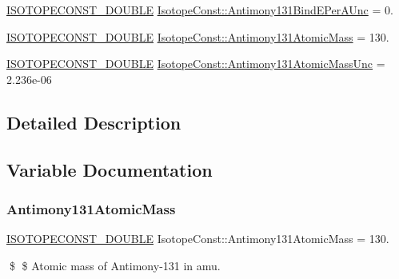 \begin{DoxyCompactItemize}
\mbox{\hyperlink{group___isotope_const-_macros_ga8f45a7272ce02c0b4c65c44636ed719a}{I\+S\+O\+T\+O\+P\+E\+C\+O\+N\+S\+T\+\_\+\+D\+O\+U\+B\+LE}} \mbox{\hyperlink{group___isotope_const-_antimony-_sb131_ga25c8487bedc66d9fea1106de04e292b6}{Isotope\+Const\+::\+Antimony131\+Bind\+E\+Per\+A\+Unc}} = 0.
\item 
\mbox{\hyperlink{group___isotope_const-_macros_ga8f45a7272ce02c0b4c65c44636ed719a}{I\+S\+O\+T\+O\+P\+E\+C\+O\+N\+S\+T\+\_\+\+D\+O\+U\+B\+LE}} \mbox{\hyperlink{group___isotope_const-_antimony-_sb131_gab1ac73d792208d32800fe08861ca58b3}{Isotope\+Const\+::\+Antimony131\+Atomic\+Mass}} = 130.
\item 
\mbox{\hyperlink{group___isotope_const-_macros_ga8f45a7272ce02c0b4c65c44636ed719a}{I\+S\+O\+T\+O\+P\+E\+C\+O\+N\+S\+T\+\_\+\+D\+O\+U\+B\+LE}} \mbox{\hyperlink{group___isotope_const-_antimony-_sb131_ga976af740903b02ac4ff76e3e7adca1db}{Isotope\+Const\+::\+Antimony131\+Atomic\+Mass\+Unc}} = 2.\+236e-\/06
\end{DoxyCompactItemize}


\subsection{Detailed Description}


\subsection{Variable Documentation}
\mbox{\label{group___isotope_const-_antimony-_sb131_gab1ac73d792208d32800fe08861ca58b3}} 
\subsubsection{\texorpdfstring{Antimony131\+Atomic\+Mass}{Antimony131AtomicMass}}
{\footnotesize\ttfamily \mbox{\hyperlink{group___isotope_const-_macros_ga8f45a7272ce02c0b4c65c44636ed719a}{I\+S\+O\+T\+O\+P\+E\+C\+O\+N\+S\+T\+\_\+\+D\+O\+U\+B\+LE}} Isotope\+Const\+::\+Antimony131\+Atomic\+Mass = 130.}

\$ \$ Atomic mass of Antimony-\/131 in amu. \mbox{\label{group___isotope_const-_antimony-_sb131_ga976af740903b02ac4ff76e3e7adca1db}} 
